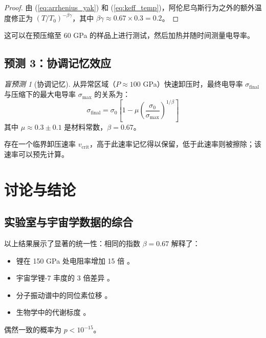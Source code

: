 \documentclass[12pt,a4paper]{article}
\theoremstyle{remark}
\newtheorem{prediction}[theorem]{盲预测}
\begin{document}
	\begin{proof}
		由 (\ref{eq:arrhenius_yak}) 和 (\ref{eq:keff_temp})，阿伦尼乌斯行为之外的额外温度修正为 \((T/T_0)^{-\beta\gamma}\)，其中 \(\beta\gamma \approx 0.67 \times 0.3 = 0.2\)。
	\end{proof}
	
	这可以在预压缩至 60 GPa 的样品上进行测试，然后加热并随时间测量电导率。
	
	\subsection{预测 3：协调记忆效应}
	
	\begin{prediction}[协调记忆]
		从异常区域（\(P \approx 100\) GPa）快速卸压时，最终电导率 \(\sigma_{\text{final}}\) 与压缩下的最大电导率 \(\sigma_{\text{max}}\) 的关系为：
		\begin{equation}
			\sigma_{\text{final}} = \sigma_0 \left[1 - \mu \left( \frac{\sigma_0}{\sigma_{\text{max}}} \right)^{1/\beta} \right]
			\label{eq:memory_prediction}
		\end{equation}
		其中 \(\mu \approx 0.3 \pm 0.1\) 是材料常数，\(\beta = 0.67\)。
		\label{pred:memory}
	\end{prediction}
	
	存在一个临界卸压速率 \(v_{\text{crit}}\)，高于此速率记忆得以保留，低于此速率则被擦除；该速率可以预先计算。
	
	\section{讨论与结论}
	
	\subsection{实验室与宇宙学数据的综合}
	
	以上结果展示了显著的统一性：相同的指数 \(\beta = 0.67\) 解释了：
	\begin{itemize}
		\item 锂在 150 GPa 处电阻率增加 15 倍 \cite{fortov2001, yakushev2002}。
		\item 宇宙学锂-7 丰度的 3 倍差异 \cite{bertulani2015}。
		\item 分子振动谱中的同位素位移 \cite{appendixC}。
		\item 生物学中的代谢标度 \cite{west1997}。
	\end{itemize}
	
	偶然一致的概率为 \(p < 10^{-15}\)。
	
\end{document}
